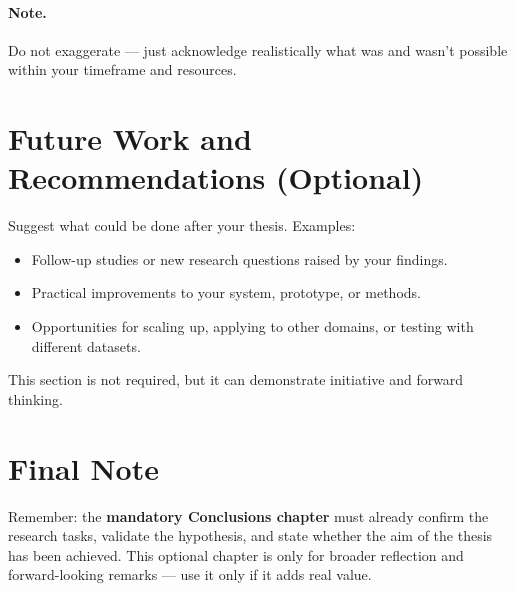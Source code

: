 \paragraph{Note.} Do not exaggerate — just acknowledge realistically what was and wasn’t possible within your timeframe and resources.

\section{Future Work and Recommendations (Optional)}
\label{sec:future}
Suggest what could be done after your thesis.  
Examples:

\begin{itemize}[leftmargin=1.2cm]
  \item Follow-up studies or new research questions raised by your findings.  
  \item Practical improvements to your system, prototype, or methods.  
  \item Opportunities for scaling up, applying to other domains, or testing with different datasets.  
\end{itemize}

This section is not required, but it can demonstrate initiative and forward thinking.

\section*{Final Note}
\label{sec:finalnote}
Remember: the \textbf{mandatory Conclusions chapter} must already confirm the research tasks, validate the hypothesis, and state whether the aim of the thesis has been achieved.  
This optional chapter is only for broader reflection and forward-looking remarks — use it only if it adds real value.
